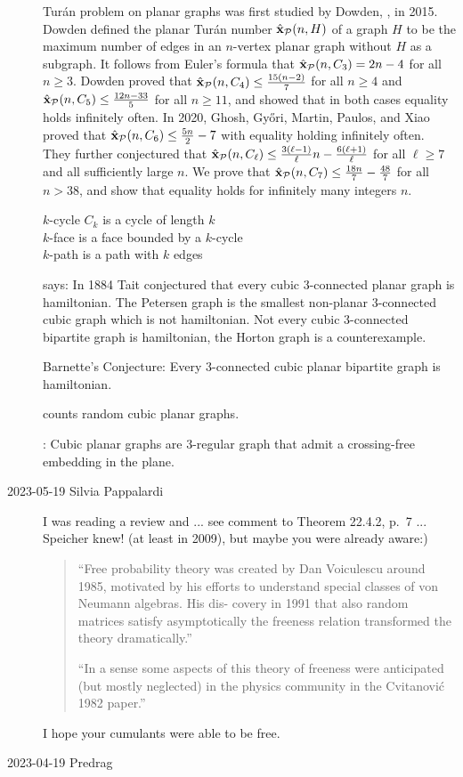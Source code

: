 \begin{description}
Tur{\'a}n problem on planar graphs was first studied by Dowden,
,
in 2015. Dowden defined the planar Tur\'an number ${\hat{\bf x}}_{\mathcal{P}}(n,H)$ of
a graph $H$ to be the maximum number of edges in an $n$-vertex planar graph
without $H$ as a subgraph. It follows from Euler's formula that
${\hat{\bf x}}_{\mathcal{P}}(n, C_3) = 2n - 4$ for all $n \ge 3$. Dowden proved that
${\hat{\bf x}}_{\mathcal{P}}(n, C_4) \le \frac{15(n-2)}{7}$ for all $n \ge 4$ and
${\hat{\bf x}}_{\mathcal{P}}(n, C_5) \le \frac{12n - 33}{5}$ for all $n \ge 11$, and
showed that in both cases equality holds infinitely often. In 2020, Ghosh,
Gy\H ori, Martin, Paulos, and Xiao  proved that
${\hat{\bf x}}_{\mathcal{P}}(n, C_6) \le \frac{5n}{2} - 7$ with equality holding
infinitely often. They further conjectured that ${\hat{\bf x}}_{\mathcal{P}}(n,
C_{\ell}) \le \frac{3(\ell - 1)}{\ell}n - \frac{6(\ell + 1)}{\ell}$ for all
$\ell \ge 7$ and all sufficiently large $n$. We prove that
${\hat{\bf x}}_{\mathcal{P}}(n,C_7) \le \frac{18n}{7} - \frac{48}{7}$ for all $n > 38$,
and show that equality holds for infinitely many integers $n$.

$k$-cycle $C_{k}$ is a cycle of length $k$
\\
$k$-face is a face bounded by a $k$-cycle
\\
$k$-path is a path with $k$ edges

 says: In 1884 Tait conjectured that every cubic
3-connected planar graph is hamiltonian.
The Petersen graph is the smallest
non-planar 3-connected cubic graph which is not hamiltonian.
Not every cubic 3-connected bipartite graph is hamiltonian,
the Horton graph is a counterexample.

Barnette's Conjecture:
Every 3-connected cubic planar bipartite graph is hamiltonian.

 counts random cubic planar graphs.

:
Cubic planar graphs are 3-regular graph that admit a crossing-free embedding in
the plane.

   \item[2023-05-19 Silvia Pappalardi]
I was reading a review  and ...
see comment to Theorem 22.4.2, p.~7 ... Speicher knew! (at least
in 2009), but maybe you were already aware:)

\begin{quote}
``Free probability theory was created by Dan Voiculescu around 1985,
motivated by his efforts to understand special classes of von Neumann
algebras. His dis- covery in 1991 that also random matrices satisfy
asymptotically the freeness relation transformed the theory
dramatically.''

``In a sense some aspects of this theory of freeness were anticipated
(but mostly neglected) in the physics community in the Cvitanovi\'c 1982
paper.''
\end{quote}

I hope your cumulants were able to be free.




   \item[2023-04-19 Predrag]

\end{description}


\printbibliography[heading=subbibintoc,title={References}]
